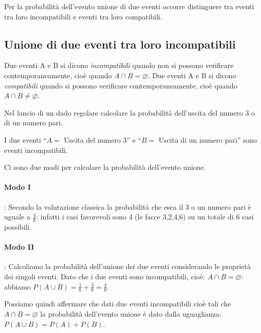 Per la probabilità dell'evento unione di due eventi occorre distinguere tra 
eventi tra loro incompatibili e eventi tra loro compatibili.

\subsection[Unione di due eventi tra loro incompatibili]{Unione di due 
eventi 
tra loro incompatibili}

\begin{definizione}
Due eventi A e B si dicono \emph{incompatibili} quando non si possono 
verificare 
contemporaneamente, cioè quando \(A\cap B=\varnothing \).
Due eventi A e B si dicono \emph{compatibili} quando si possono verificare 
contemporaneamente, cioè quando \(A\cap B\neq \varnothing \).
\end{definizione}

\begin{esempio}
Nel lancio di un dado regolare calcolare la probabilità dell'uscita del 
numero 
3 
o di un numero pari.

I due eventi ``\( A= \) Uscita del numero 3'' e ``\( B= \) Uscita di un numero 
pari'' sono eventi incompatibili.

Ci sono due modi per calcolare la probabilità dell'evento unione.
\paragraph{Modo I}: Secondo la valutazione classica la probabilità che esca 
il 
\(3\) o un numero pari è uguale a \(\frac 4 6\): infatti i casi favorevoli sono 
4 
(le facce 3,2,4,6) su un totale di \(6\) casi possibili.
\paragraph{Modo II}: Calcoliamo la probabilità dell'unione dei due eventi 
considerando le proprietà dei singoli eventi. Dato che i due eventi sono 
incompatibili, cioè: \(A\cap B=\varnothing \): abbiamo \(P(A\cup B)=\frac 1 
6+\frac 
3 
6=\frac 4 6\).
\begin{center}
 
\end{center}
\end{esempio}

Possiamo quindi affermare che dati due eventi incompatibili cioè tali che 
\(A\cap 
B=\varnothing \) la probabilità dell'evento unione è dato dalla uguaglianza: 
\(P(A\cup B)=P(A)+P(B)\).

